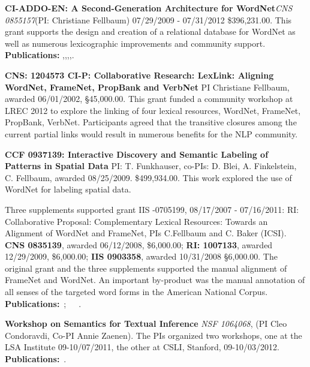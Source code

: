 \documentclass[10pt]{article}
\newcommand{\miniskip}{\vspace*{1mm}}
\begin{document}
\noindent
{\bf CI-ADDO-EN: A Second-Generation Architecture for WordNet}{\it CNS 0855157}(PI: Christiane Fellbaum) 07/29/2009 - 07/31/2012
\$396,231.00. This grant supports the design and creation of a relational database for WordNet as well as numerous lexicographic improvements 
and community support. {\bf Publications:} \cite{fellbaumvossen2012},\cite{fellbaumencyclopedia},\cite{fellbaumontology2010},\cite{chiarcosinpress},\cite{nikolova2012}.

\noindent
{\bf CNS: 1204573 CI-P: Collaborative Research: LexLink: Aligning WordNet, FrameNet, PropBank and VerbNet} PI Christiane Fellbaum, awarded 06/01/2002, 
\S45,000.00. This grant funded a community workshop at LREC 2012 to explore the linking of four lexical resources, WordNet, FrameNet, PropBank, VerbNet. 
Participants agreed that the transitive closures among the current partial links would result in numerous benefits for the NLP community. 

\noindent
{\bf CCF 0937139: Interactive Discovery and Semantic Labeling of Patterns in Spatial Data} PI: T. Funkhauser, co-PIs: D. Blei, A. Finkelstein, C. Fellbaum, awarded 08/25/2009.
\$499,934.00. This work explored the use of WordNet for labeling spatial data. 

\noindent
Three supplements supported grant IIS -0705199, 08/17/2007 - 07/16/2011: RI: Collaborative Proposal: Complementary Lexical Resources: 
Towards an Alignment of WordNet and FrameNet, PIs C.Fellbaum and C. Baker (ICSI). 
{\bf CNS 0835139}, awarded 06/12/2008, \$6,000.00; {\bf RI: 1007133}, awarded 12/29/2009, \$6,000.00; {\bf IIS 0903358}, awarded 10/31/2008 \S6,000.00. 
The original grant and the three supplements supported the manual alignment of FrameNet and WordNet. An important by-product was the manual 
annotation of all senses of the targeted word forms in the American National Corpus. {\bf Publications:}~\cite{fellbaumbakerLRE};~\cite{bakerfellbaum2008}~\cite{bakerfellbaum2009}~\cite{demelo2012}.


\noindent
{\bf Workshop on Semantics for Textual Inference}
{\it  NSF  1064068}, (PI Cleo Condoravdi, Co-PI Annie Zaenen). The PIs organized two workshops, one at the LSA Institute 09-10/07/2011, the other at CSLI, Stanford, 09-10/03/2012.
{\bf Publications:}~\cite{Lilt-special-issue}.

 \nocite{zaenen+karttunen:2013}
\nocite{csli-gang-cssp13}
\nocite{csli-gang-cil13}
\nocite{faust-adj-pol-lex}
\end{document}
